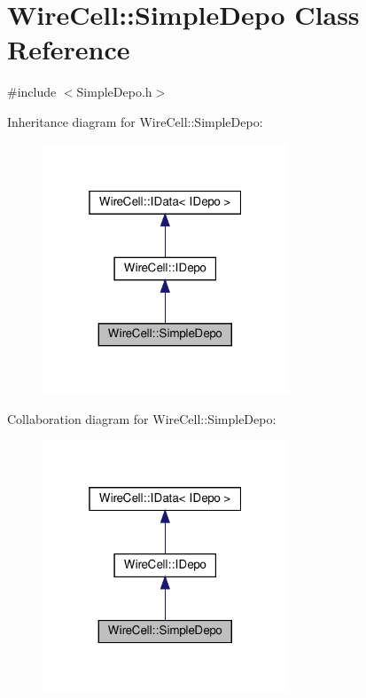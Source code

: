 \hypertarget{class_wire_cell_1_1_simple_depo}{}\section{Wire\+Cell\+:\+:Simple\+Depo Class Reference}
\label{class_wire_cell_1_1_simple_depo}


{\ttfamily \#include $<$Simple\+Depo.\+h$>$}



Inheritance diagram for Wire\+Cell\+:\+:Simple\+Depo\+:
\nopagebreak
\begin{figure}[H]
\begin{center}
\leavevmode
\includegraphics[width=208pt]{class_wire_cell_1_1_simple_depo__inherit__graph}
\end{center}
\end{figure}


Collaboration diagram for Wire\+Cell\+:\+:Simple\+Depo\+:
\nopagebreak
\begin{figure}[H]
\begin{center}
\leavevmode
\includegraphics[width=208pt]{class_wire_cell_1_1_simple_depo__coll__graph}
\end{center}
\end{figure}
